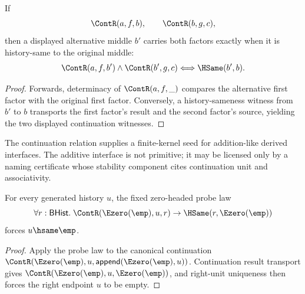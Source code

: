 \begin{theorem}
\label{thm:cont-factorization-middle-hsame-iff}
If
$$
\ContR(a,f,b),\qquad \ContR(b,g,c),
$$
then a displayed alternative middle $b'$ carries both factors exactly when it
is history-same to the original middle:
$$
\ContR(a,f,b')\land \ContR(b',g,c)
\Longleftrightarrow
\HSame(b',b).
$$
\end{theorem}
\begin{proof}
Forwards, determinacy of $\ContR(a,f,\_)$ compares the alternative first
factor with the original first factor. Conversely, a history-sameness witness
from $b'$ to $b$ transports the first factor's result and the second factor's
source, yielding the two displayed continuation witnesses.
\end{proof}

\begin{corollary}
\label{cor:addition-like-behavior-requires-no-primitive-addition}
The continuation relation supplies a finite-kernel seed for addition-like derived interfaces. The additive interface is not primitive; it may be licensed only by a naming certificate whose stability component cites continuation unit and associativity.
\end{corollary}

\begin{theorem}
\label{thm:cont-e0-right-unit-probe-forces-empty}
For every generated history $u$, the fixed zero-headed probe law
$$
\forall r:\mathsf{BHist}.\;
\ContR(\Ezero(\emp),u,r)\to \HSame(r,\Ezero(\emp))
$$
forces $u\hsame\emp$.
\end{theorem}
\begin{proof}
Apply the probe law to the canonical continuation
$\ContR(\Ezero(\emp),u,\mathsf{append}(\Ezero(\emp),u))$. Continuation result
transport gives $\ContR(\Ezero(\emp),u,\Ezero(\emp))$, and right-unit
uniqueness then forces the right endpoint $u$ to be empty.
\end{proof}
